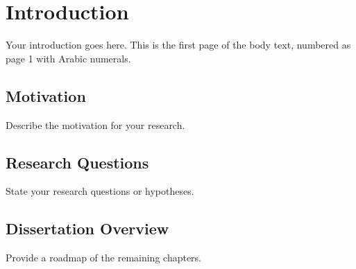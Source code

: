 \chapter{Introduction}
\label{ch:introduction}

Your introduction goes here. This is the first page of the body text, numbered as page 1 with Arabic numerals.

\section{Motivation}

Describe the motivation for your research.

\section{Research Questions}

State your research questions or hypotheses.

\section{Dissertation Overview}

Provide a roadmap of the remaining chapters.
